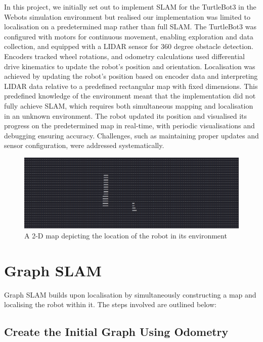 In this project, we initially set out to implement SLAM for the TurtleBot3 in the Webots simulation environment but realised our implementation was limited to localisation on a predetermined map rather than full SLAM. The TurtleBot3 was configured with motors for continuous movement, enabling exploration and data collection, and equipped with a LIDAR sensor for 360 degree obstacle detection. Encoders tracked wheel rotations, and odometry calculations used differential drive kinematics to update the robot's position and orientation. Localisation was achieved by updating the robot’s position based on encoder data and interpreting LIDAR data relative to a predefined rectangular map with fixed dimensions. This predefined knowledge of the environment meant that the implementation did not fully achieve SLAM, which requires both simultaneous mapping and localisation in an unknown environment. The robot updated its position and visualised its progress on the predetermined map in real-time, with periodic visualisations and debugging ensuring accuracy. Challenges, such as maintaining proper updates and sensor configuration, were addressed systematically.




\begin{figure}[H]
    \centering
    \includegraphics[width=1.0\linewidth]{assets/images/localisation/map.png}
    \caption{A 2-D map depicting the location of the robot in its environment}
    \label{fig: map}
\end{figure}

\section{Graph SLAM}

Graph SLAM builds upon localisation by simultaneously constructing a map and localising the robot within it. The steps involved are outlined below:

\subsection{Create the Initial Graph Using Odometry}

